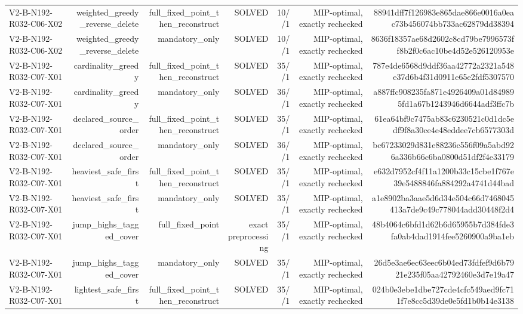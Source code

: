 {\begin{longtable}{lrrrrrr}
V2-B-N192-R032-C06-X02 & weighted\_greedy\_reverse\_delete & full\_fixed\_point\_then\_reconstruct & SOLVED & 10//1 & MIP-optimal, exactly rechecked & 88941dff7f126983e865dae866e0016a0eac73b456074bb733ac62879dd38394 \\
V2-B-N192-R032-C06-X02 & weighted\_greedy\_reverse\_delete & mandatory\_only & SOLVED & 10//1 & MIP-optimal, exactly rechecked & 8636f18357ae68d2602c8cd79be7996573ff8b2f0c6ac10be4d52e526120953e \\
V2-B-N192-R032-C07-X01 & cardinality\_greedy & full\_fixed\_point\_then\_reconstruct & SOLVED & 35//1 & MIP-optimal, exactly rechecked & 787e4de6568d9ddf36aa42772a2321a548e37d6b4f31d0911e65e2fdf5307570 \\
V2-B-N192-R032-C07-X01 & cardinality\_greedy & mandatory\_only & SOLVED & 36//1 & MIP-optimal, exactly rechecked & a887ffc908235fa871e4926409a01d849895fd1a67b1243946d6644adf3ffc7b \\
V2-B-N192-R032-C07-X01 & declared\_source\_order & full\_fixed\_point\_then\_reconstruct & SOLVED & 35//1 & MIP-optimal, exactly rechecked & 61ea64bf9c7475ab83c6230521c0d1dc5edf9f8a30ce4e48eddee7cb6577303d \\
V2-B-N192-R032-C07-X01 & declared\_source\_order & mandatory\_only & SOLVED & 36//1 & MIP-optimal, exactly rechecked & bc67233029d831e88236c556f09a5abd926a336b66c6ba0800d51df2f4e33179 \\
V2-B-N192-R032-C07-X01 & heaviest\_safe\_first & full\_fixed\_point\_then\_reconstruct & SOLVED & 35//1 & MIP-optimal, exactly rechecked & e632d7952cf4f11a1200b33c15cbe1f767e39e5488846fa884292a4741d44bad \\
V2-B-N192-R032-C07-X01 & heaviest\_safe\_first & mandatory\_only & SOLVED & 35//1 & MIP-optimal, exactly rechecked & a1e8902ba3aae5d6d34e504c66d7468045413a7de9c49c778044add30448f2d4 \\
V2-B-N192-R032-C07-X01 & jump\_highs\_tagged\_cover & full\_fixed\_point & exact preprocessing & 35//1 & MIP-optimal, exactly rechecked & 48b4064c6bfd1d62b6d65955b7d384fde3fa0ab4dad1914fee5260900a9ba1eb \\
V2-B-N192-R032-C07-X01 & jump\_highs\_tagged\_cover & mandatory\_only & SOLVED & 35//1 & MIP-optimal, exactly rechecked & 26d5e3ae6ec63eec6b04ed73fdfef9d6b7921e235f05aa42792460e3d7e19a47 \\
V2-B-N192-R032-C07-X01 & lightest\_safe\_first & full\_fixed\_point\_then\_reconstruct & SOLVED & 35//1 & MIP-optimal, exactly rechecked & 024b0e3ebe1dbe727cde4cfc549aed9fc711f7e8cc5d39de0e5fd1b0b14e3138 \\

\end{longtable}}
